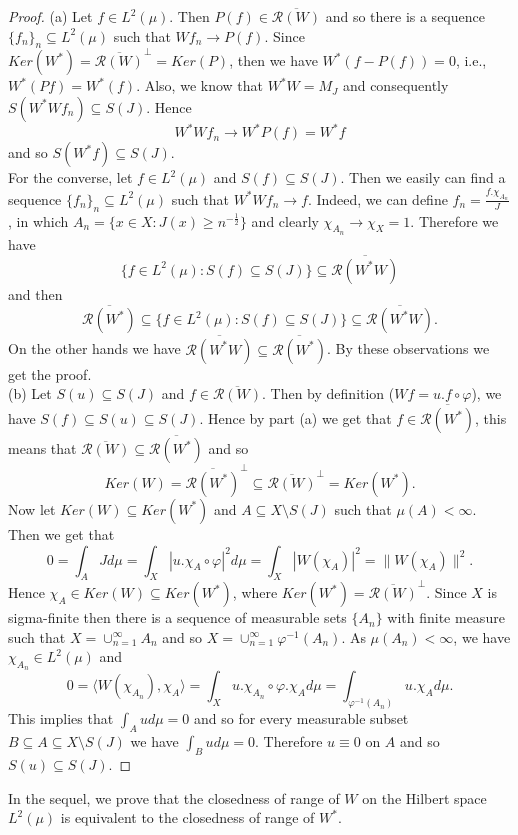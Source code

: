 \documentclass{amsart}
\theoremstyle{definition}\newtheorem{defn}[thm]{Definition}
\theoremstyle{remark}
\numberwithin{equation}{section}
\begin{document}
\begin{proof}
(a) Let $f\in L^2(\mu)$. Then $P(f)\in \overline{\mathcal{R}(W)}$ and so there is a sequence $\{f_n\}_n\subseteq L^2(\mu)$ such that $Wf_n\rightarrow P(f)$. Since $Ker(W^*)=\overline{\mathcal{R}(W)}^{\perp}=Ker(P)$, then we have $W^*(f-P(f))=0$, i.e., $W^*(Pf)=W^*(f)$. Also, we know that $W^*W=M_J$ and consequently $S(W^*Wf_n)\subseteq S(J)$. Hence 
$$W^*Wf_n\rightarrow W^*P(f)=W^*f$$ 
and so $S(W^*f)\subseteq S(J)$.\\
For the converse, let $f\in L^2(\mu)$ and $S(f)\subseteq S(J)$. Then we easily can find a sequence $\{f_n\}_n\subseteq L^2(\mu)$ such that $W^*Wf_n\rightarrow f$. Indeed, we can define $f_n=\frac{f.\chi_{A_n}}{J}$, in which $A_n=\{x\in X: J(x)\geq n^{-\frac{1}{2}}\}$ and clearly $\chi_{A_n}\rightarrow \chi_X=1$. Therefore we have
 $$\{f\in L^2(\mu): S(f)\subseteq S(J)\}\subseteq \overline{\mathcal{R}(W^*W)}$$
and then 
 $$\overline{\mathcal{R}(W^*)}\subseteq\{f\in L^2(\mu): S(f)\subseteq S(J)\}\subseteq \overline{\mathcal{R}(W^*W)}.$$
 On the other hands we have $\overline{\mathcal{R}(W^*W)}\subseteq \overline{\mathcal{R}(W^*)}$. By these observations we get the proof.\\
(b) Let $S(u)\subseteq S(J)$ and $f\in \overline{\mathcal{R}(W)}$. Then by definition ($Wf=u.f\circ\varphi$), we have $S(f)\subseteq S(u)\subseteq S(J)$. Hence by part (a) we get that $f\in \overline{\mathcal{R}(W^*)}$, this means that $\overline{\mathcal{R}(W)}\subseteq \overline{\mathcal{R}(W^*)}$ and so $$Ker(W)=\overline{\mathcal{R}(W^*)}^{\perp}\subseteq \overline{\mathcal{R}(W)}^{\perp}=Ker(W^*).$$
 Now let $Ker(W)\subseteq Ker(W^*)$ and $A\subseteq X\setminus S(J)$ such that $\mu(A)<\infty$. Then we get that 
 $$0=\int_AJd\mu=\int_X|u.\chi_A\circ\varphi|^2 d\mu=\int_X|W(\chi_A)|^2=\|W(\chi_A)\|^2.$$
 Hence $\chi_A\in Ker(W)\subseteq Ker(W^*)$, where $Ker(W^*)=\overline{\mathcal{R}(W)}^{\perp}$. Since $X$ is sigma-finite then there is a sequence of measurable sets $\{A_n\}$ with finite measure such that $X=\cup^{\infty}_{n=1}A_n$ and so $X=\cup^{\infty}_{n=1}\varphi^{-1}(A_n)$. As $\mu(A_n)<\infty$, we have $\chi_{A_n}\in L^2(\mu)$ and 
 $$0=\langle W(\chi_{A_n}),\chi_A\rangle=\int_X u.\chi_{A_n}\circ\varphi.\chi_Ad\mu=\int_{\varphi^{-1}(A_n)} u.\chi_Ad\mu.$$
 This implies that $\int_A ud\mu=0$ and so for every measurable subset $B\subseteq A\subseteq X\setminus S(J)$ we have $\int_B ud\mu=0$. Therefore $u\equiv 0$ on $A$ and so $S(u)\subseteq S(J)$.
\end{proof}
In the sequel, we prove that the closedness of range of $W$ on the Hilbert space $L^2(\mu)$ is equivalent to the closedness of range of $W^*$.
\end{document}
